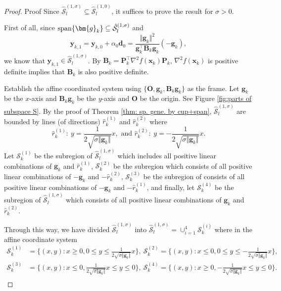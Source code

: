 \documentclass[colorlinks=true, linkcolor=blue, citecolor=blue, urlcolor=blue]{article}
\theoremstyle{plain}
\theoremstyle{definition}
\theoremstyle{remark}
\begin{document}
\begin{proof}{Proof}
Since $\hat{\mathcal{S}}_l^{(1,\sigma)}\subseteq\hat{\mathcal{S}}_l^{(1,0)}$, it suffices to prove the result for $\sigma>0$.

First of all, since ${\rm span} \{\bm{g}_k\}\subseteq \hat{\mathcal{S}}_l^{(1,\sigma)}$ and
    \[
    \bm{y}_{k,1}=\bm{y}_{k,0}+\alpha_0 \bm{d}_0=\frac{\Vert \bm{g}_k\Vert^2}{\bm{g}_k^\top\bm{B}_k\bm{g}_k}(-\bm{g}_k), 
    \] 
    we know that $\bm y_{k,1}\in \hat{\mathcal{S}}_l^{(1,\sigma)}$. By $\bm B_k=\bm P_k^\top\nabla^2f(\bm x_k)\bm P_k$, $\nabla^2f(\bm x_k)$ is positive definite implies that $\bm B_k$ is also positive definite.

Establish the affine coordinated system using $\{\bm O,\bm g_k,\bm B_k\bm g_k\}$ as the frame. Let $\bm g_k$ be the $x$-axis and $\bm B_k\bm g_k$ be the $y$-axis and $\bm O$ be the origin.
See Figure \ref{fig:parts of subspace S}. By the proof of Theorem \ref{thm: sp. gene. by cup+span}, $\hat{\mathcal{S}}_l^{(1,\sigma)}$ are bounded by lines (of directions) $\hat{r}_k^{(1)}$ and $\hat{r}_k^{(2)}$ where 
$$\hat{r}_k^{(1)}:\ y=\frac{1}{2\sqrt{\sigma \Vert\bm g_k\Vert}}x,\text{ and }\hat{r}_k^{(2)}:\  y=-\frac{1}{2\sqrt{\sigma \Vert\bm g_k\Vert}}x.$$
Let $\mathcal{S}_k^{(1)}$ be the subregion of $\hat{\mathcal{S}}_l^{(1,\sigma)}$ which includes all positive linear combinations of $\bm g_k$ and $\hat{r}_k^{(1)}$, $\mathcal{S}_k^{(2)}$ be the subregion which consists of all positive linear combinations of $-\bm g_k$ and $-\hat{r}_k^{(2)}$, $\mathcal{S}_k^{(3)}$ be the subregion of consists of all positive linear combinations of $-\bm g_k$  and $-\hat{r}_k^{(1)}$, and finally, let $\mathcal{S}_k^{(4)}$ be the subregion of $\hat{\mathcal{S}}_l^{(1,\sigma)}$ which consists of all positive linear combinations of $\bm g_k$ and $\hat{r}_k^{(2)}$.

Through this way, we have divided $\hat{\mathcal{S}}_l^{(1,\sigma)}$ into $\hat{\mathcal{S}}_l^{(1,\sigma)}=\cup_{i=1}^{4}\mathcal{S}_k^{(i)}$ where in the affine coordinate system
\begin{equation*}
    \begin{aligned}
        \mathcal{S}_k^{(1)}&=\{(x,y):x\geq0,0\leq y\leq \frac{1}{2\sqrt{\sigma \Vert\bm g_k\Vert}} x\},\
        \mathcal{S}_k^{(2)}=\{(x,y):x\leq 0,0\leq y\leq -\frac{1}{2\sqrt{\sigma \Vert\bm g_k\Vert}} x\},\\
        \mathcal{S}_k^{(3)}&=\{(x,y):x\leq0,\frac{1}{2\sqrt{\sigma \Vert\bm g_k\Vert}} x\leq y\leq 0\},\
        \mathcal{S}_k^{(4)}=\{(x,y):x\geq0,-\frac{1}{2\sqrt{\sigma \Vert\bm g_k\Vert}} x\leq y\leq 0\}.\\
    \end{aligned}
\end{equation*}


\end{proof}
\end{document}
